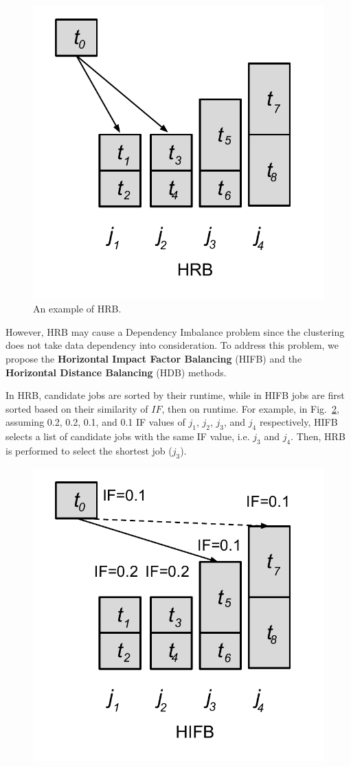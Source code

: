 \documentclass[final,5p,times,twocolumn]{elsarticle}
\begin{document}
\begin{figure}[htb]
	\centering
	\includegraphics[width=0.5\linewidth]{figure/algorithm_hrb.pdf}
	\caption{An example of HRB.}
	\label{fig:algorithm_hrb}
	\vspace{-15pt}
\end{figure}

However, HRB may cause a Dependency Imbalance problem since the clustering does not take data dependency into consideration. To address this problem, we propose the \textbf{Horizontal Impact Factor Balancing} (HIFB) and the \textbf{Horizontal Distance Balancing} (HDB) methods. 

In HRB, candidate jobs are sorted by their runtime, while in HIFB jobs are first sorted based on their similarity of $IF$, then on runtime. For example, in Fig.~\ref{fig:algorithm_hifb}, assuming 0.2, 0.2, 0.1, and 0.1 IF values of $j_1$, $j_2$, $j_3$, and $j_4$ respectively, HIFB selects a list of candidate jobs with the same IF value, i.e. $j_3$ and $j_4$. Then, HRB is performed to select the shortest job ($j_3$). 

\begin{figure}[htb]
	\centering
	\includegraphics[width=0.5\linewidth]{figure/algorithm_hifb.pdf}
	\label{fig:algorithm_hifb}
	\vspace{-15pt}
\end{figure}
\end{document}
